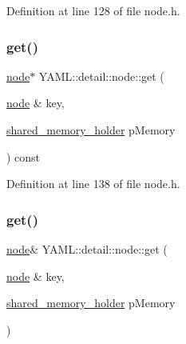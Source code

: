Definition at line 128 of file node.\+h.

\mbox{\label{class_y_a_m_l_1_1detail_1_1node_aae5710fc2a71d0d4d0a46da3cb7ec06b}} 
\subsubsection{\texorpdfstring{get()}{get()}\hspace{0.1cm}{\footnotesize\ttfamily [3/4]}}
{\footnotesize\ttfamily \mbox{\hyperlink{class_y_a_m_l_1_1detail_1_1node}{node}}$\ast$ Y\+A\+M\+L\+::detail\+::node\+::get (\begin{DoxyParamCaption}\item[{\mbox{\hyperlink{class_y_a_m_l_1_1detail_1_1node}{node}} \&}]{key,  }\item[{\mbox{\hyperlink{namespace_y_a_m_l_1_1detail_a228c4b3b6ba1058b474d40afc218e21d}{shared\+\_\+memory\+\_\+holder}}}]{p\+Memory }\end{DoxyParamCaption}) const\hspace{0.3cm}{\ttfamily [inline]}}



Definition at line 138 of file node.\+h.

\mbox{\label{class_y_a_m_l_1_1detail_1_1node_af509ee1699111cde57b6c30255a377a5}} 
\subsubsection{\texorpdfstring{get()}{get()}\hspace{0.1cm}{\footnotesize\ttfamily [4/4]}}
{\footnotesize\ttfamily \mbox{\hyperlink{class_y_a_m_l_1_1detail_1_1node}{node}}\& Y\+A\+M\+L\+::detail\+::node\+::get (\begin{DoxyParamCaption}\item[{\mbox{\hyperlink{class_y_a_m_l_1_1detail_1_1node}{node}} \&}]{key,  }\item[{\mbox{\hyperlink{namespace_y_a_m_l_1_1detail_a228c4b3b6ba1058b474d40afc218e21d}{shared\+\_\+memory\+\_\+holder}}}]{p\+Memory }\end{DoxyParamCaption})\hspace{0.3cm}{\ttfamily [inline]}}



